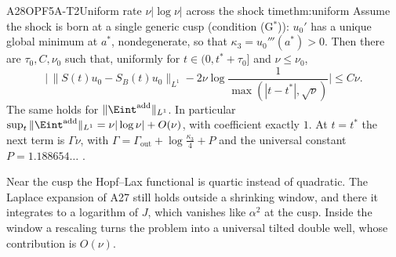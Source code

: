 \begin{dimcard}{A28}{OPF5A-T2}{Uniform rate $\nu|\log\nu|$ across the shock time}{}{thm:uniform}
\label{dim:OPF5A-T1}%
Assume the shock is born at a single generic cusp (condition (G$^*$)): $u_0'$ has a unique global minimum at $a^*$, nondegenerate, so that $\kappa_3=u_0'''(a^*)>0$. Then there are $\tau_0,C,\nu_0$ such that, uniformly for $t\in(0,t^*+\tau_0]$ and $\nu\le\nu_0$,
\[
\Big|\,\|S(t)u_0-S_B(t)u_0\|_{L^1}-2\nu\log\frac{1}{\max(|t-t^*|,\sqrt\nu)}\Big|\le C\nu .
\]
The same holds for $\|\Eint^{\mathrm{add}}\|_{L^1}$. In particular $\sup_t\|\Eint^{\mathrm{add}}\|_{L^1}=\nu|\log\nu|+O(\nu)$, with coefficient exactly $1$. At $t=t^*$ the next term is $\Gamma\nu$, with $\Gamma=\Gamma_{\mathrm{out}}+\log\frac{\kappa_3}{4}+P$ and the universal constant $P=1.188654\ldots$ .
\end{dimcard}

\begin{proofidea}
Near the cusp the Hopf--Lax functional is quartic instead of quadratic. The Laplace expansion of A27 still holds outside a shrinking window, and there it integrates to a logarithm of $J$, which vanishes like $\alpha^2$ at the cusp. Inside the window a rescaling turns the problem into a universal tilted double well, whose contribution is $O(\nu)$.
\end{proofidea}

